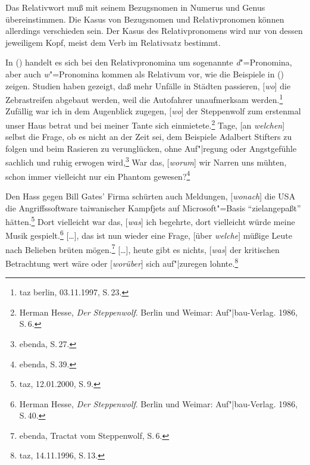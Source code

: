 {Das Relativwort muß mit seinem Bezugsnomen in Numerus und Genus übereinstimmen. Die Kasus von
Bezugsnomen und Relativpronomen können allerdings verschieden sein. Der Kasus des Relativpronomens
wird nur von dessen jeweiligem Kopf, meist dem Verb im Relativsatz bestimmt.

In () handelt es sich bei den Relativpronomina um sogenannte \emph{d}"=Pronomina, aber
auch \emph{w}"=Pronomina kommen als Relativum vor, wie die Beispiele in () zeigen.
\eal
\label{bsp-rs-w-pron}
\ex Studien haben gezeigt, daß mehr Unfälle in Städten passieren, [\emph{wo}] 
      die Zebrastreifen abgebaut werden, weil die Autofahrer unaufmerksam werden.\footnote{
        taz berlin, 03.11.1997, S.\,23.
        }
\ex Zufällig war ich in dem Augenblick zugegen, [\emph{wo}] der Steppenwolf 
      zum erstenmal unser Haus betrat und bei meiner Tante sich einmietete.\footnote{
                Herman Hesse, \emph{Der Steppenwolf}. Berlin und Weimar: Auf"|bau-Verlag. 1986, S.\,6.
	}
\ex Tage, [an \emph{welchen}] selbst die Frage, ob es nicht an der Zeit sei, dem Beispiele
      Adalbert Stifters zu folgen und beim Rasieren zu verunglücken, ohne Auf"|regung
      oder Angstgefühle sachlich und ruhig erwogen wird,\footnote{
		ebenda, S.\,27.
	}
\ex War das, [\emph{worum}] wir Narren uns mühten, schon immer vielleicht nur ein Phantom gewesen?\footnote{
		ebenda, S.\,39.
	}

\ex Den Hass gegen Bill Gates' Firma schürten auch Meldungen, [\emph{wonach}] die USA die Angriffssoftware
      taiwanischer Kampfjets auf Microsoft"=Basis "`ziel\-an\-ge\-paßt"' hätten.\footnote{
        taz, 12.01.2000, S.\,9.
      }
\ex Dort vielleicht war das, [\emph{was}] ich begehrte, dort vielleicht würde meine Musik gespielt.\footnote{
                Herman Hesse, \emph{Der Steppenwolf}. Berlin und Weimar: Auf"|bau-Verlag. 1986, S.\,40.
	}\label{bsp-meine-musik}
\ex {}[\ldots], das ist nun wieder eine Frage, [über \emph{welche}] müßige Leute nach Belieben brüten
	mögen.\footnote{
                ebenda, Tractat vom Steppenwolf, S.\,6.
	} 
\ex {}[\ldots], heute gibt es nichts, [\emph{was}] der kritischen Betrachtung wert wäre oder
      [\emph{wor\-über}] sich auf"|zuregen lohnte.\footnote{
	taz, 14.11.1996, S.\,13.
      }
\zl
{}

}
